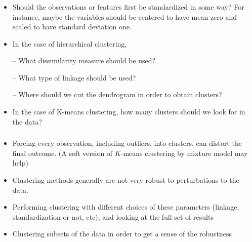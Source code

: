 \documentclass{beamer}
\begin{document}
               		 \begin{frame}
               		 	\frametitle{}
               		 	\begin{itemize}
               		\item 
               		  Should the observations or features first be standardized in some way?
               		For instance, maybe the variables should be centered to have mean
               		zero and scaled to have standard deviation one.
               	
               	\item In the case of hierarchical clustering,
               	
               		– What dissimilarity measure should be used?
               		
               		– What type of linkage should be used?
               		
               		– Where should we cut the dendrogram in order to obtain clusters?
               	\item  In the case of K-means clustering, how many clusters should we look
               		for in the data?
               	
               		
               	\end{itemize}
               \end{frame}  
                
                
             \begin{frame}
             	\frametitle{ }
             	\begin{itemize}
             		\item Forcing every observation, including outliers, into clusters, can distort
             		the final outcome.
        (A soft version  of $K$-means clustering by mixture model may help)
             		
             		\item Clustering methods generally are not very robust to perturbations
             		to the data.
             		
             		\item Performing clustering with
             		different choices of these parameters (linkage, standardization or not, etc), and looking at the full set of results
             		\item Clustering subsets of the data in order to get a
             		sense of the robustness
             	
             		
             	\end{itemize}
             \end{frame}  
           
\end{document}
